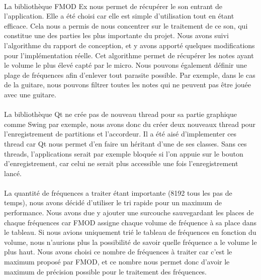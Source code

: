 \paragraph{}
La bibliothèque FMOD Ex nous permet de récupérer le son entrant de l'application. Elle a été choisi car elle est simple 
d'utilisation tout en étant efficace. Cela nous a permis de nous concentrer sur le traitement de ce son, qui constitue 
une des parties les plus importante du projet. Nous avons suivi l'algorithme du rapport de conception, et y avons apporté 
quelques modifications pour l'implémentation réelle. Cet algorithme permet de récupérer les notes ayant le volume le plus 
élevé capté par le micro. Nous pouvons également définir une plage de fréquences afin d'enlever tout parasite possible. Par exemple, 
dans le cas de la guitare, nous pouvons filtrer toutes les notes qui ne peuvent pas être jouée avec une guitare. 

\paragraph{}
La bibliothèque Qt ne crée pas de nouveau thread pour sa partie graphique comme Swing par exemple, nous avons donc du créer deux nouveaux 
thread pour l'enregistrement de partitions et l'accordeur. Il a été aisé d'implementer ces thread car Qt nous permet d'en 
faire un héritant d'une de ses classes. Sans ces threads, l'applications serait par exemple bloquée si l'on appuie sur le 
bouton d'enregistrement, car celui ne serait plus accessible une fois l'enregistrement lancé.

\paragraph{}
La quantité de fréquences a traiter étant importante (8192 tous les pas de temps), nous avons décidé d'utiliser 
le tri rapide pour un maximum de performance. Nous avons due y ajouter une surcouche sauvegardant les places de chaque fréquences 
car FMOD assigne chaque volume de fréquence à sa place dans le tableau. Si nous avions uniquement trié le tableau de fréquences 
en fonction du volume, nous n'aurions plus la possibilité de savoir quelle fréquence a le volume le plus haut. Nous avons choisi 
ce nombre de fréquences à traiter car c'est le maximum proposé par FMOD, et ce nombre nous permet donc d'avoir le maximum de 
précision possible pour le traitement des fréquences.

